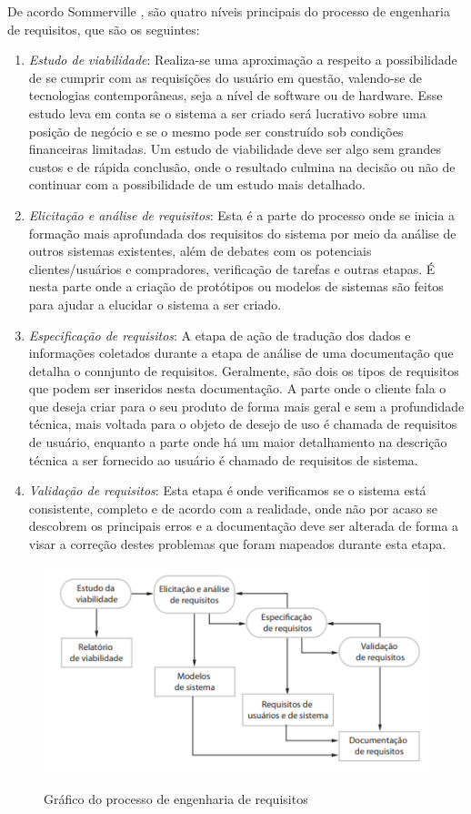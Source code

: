 De acordo Sommerville \cite{Sommerville07}, são quatro níveis principais do processo de engenharia de requisitos, que são os seguintes:
\begin{enumerate}
    \item \textit{Estudo de viabilidade}: Realiza-se uma aproximação a respeito a possibilidade de se cumprir com as requisições do usuário em questão, valendo-se de tecnologias contemporâneas, seja a nível de software ou de hardware. Esse estudo leva em conta se o sistema a ser criado será lucrativo sobre uma posição de negócio e se o mesmo pode ser construído sob condições financeiras limitadas. Um estudo de viabilidade deve ser algo sem grandes custos e de rápida conclusão, onde o resultado culmina na decisão ou não de continuar com a possibilidade de um estudo mais detalhado.
    \item \textit{Elicitação e análise de requisitos}: Esta é a parte do processo onde se inicia a formação mais aprofundada dos requisitos do sistema por meio da análise de outros sistemas existentes, além de debates com os potenciais clientes/usuários e compradores, verificação de tarefas e outras etapas. É nesta parte onde a criação de protótipos ou modelos de sistemas são feitos para ajudar a elucidar o sistema a ser criado.
    \item \textit{Especificação de requisitos}: A etapa de ação de tradução dos dados e informações coletados durante a etapa de análise de uma documentação que detalha o connjunto de requisitos. Geralmente, são dois os tipos de requisitos que podem ser inseridos nesta documentação. A parte onde o cliente fala o que deseja criar para o seu produto de forma mais geral e sem a profundidade técnica, mais voltada para o objeto de desejo de uso é chamada de requisitos de usuário, enquanto a parte onde há um maior detalhamento na descrição técnica a ser fornecido ao usuário é chamado de requisitos de sistema.
    \item \textit{Validação de requisitos}: Esta etapa é onde verificamos se o sistema está consistente, completo e de acordo com a realidade, onde não por acaso se descobrem os principais erros e a documentação deve ser alterada de forma a visar a correção destes problemas que foram mapeados durante esta etapa.
\end{enumerate}

\begin{figure}
    \centering
    \includegraphics{img/eng_req.png}
    \caption{Gráfico do processo de engenharia de requisitos} \cite{Sommerville07}
    \label{fig:eng_req}
\end{figure}

